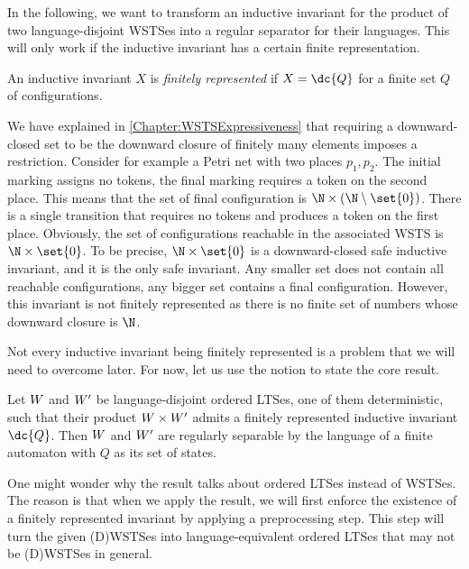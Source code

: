 \documentclass[../../diss.tex]{subfiles}
\begin{document}
In the following, we want to transform an inductive invariant for the product of two language-disjoint WSTSes into a regular separator for their languages.
This will only work if the inductive invariant has a certain finite representation.

\begin{definition}
    An inductive invariant $X$ is \emph{finitely represented} if $X = \dc{Q}$ for a finite set $Q$ of configurations.
\end{definition}

We have explained in \cref{Chapter:WSTSExpressiveness} that requiring a downward-closed set to be the downward closure of finitely many elements imposes a restriction.
Consider for example a Petri net with two places $p_1, p_2$.
The initial marking assigns no tokens, the final marking requires a token on the second place.
This means that the set of final configuration is $\N \times (\N \setminus \set{0})$.
There is a single transition that requires no tokens and produces a token on the first place.
Obviously, the set of configurations reachable in the associated WSTS is $\N \times \set{0}$.
To be precise, $\N \times \set{0}$ is a downward-closed safe inductive invariant, and it is the only safe invariant.
Any smaller set does not contain all reachable configurations, any bigger set contains a final configuration.
However, this invariant is not finitely represented as there is no finite set of numbers whose downward closure is $\N$.

Not every inductive invariant being finitely represented is a problem that we will need to overcome later.
For now, let us use the notion to state the core result.

\begin{theorem}%
\label{Theorem:WSTSSeparabilityCore}%
    Let $W$ and $W'$ be language-disjoint ordered LTSes, one of them deterministic, such that their product $W \times W'$ admits a finitely represented inductive invariant $\dc{Q}$.
    Then $W$ and $W'$ are regularly separable by the language of a finite automaton with $Q$ as its set of states.
\end{theorem}

One might wonder why the result talks about ordered LTSes instead of WSTSes.
The reason is that when we apply the result, we will first enforce the existence of a finitely represented invariant by applying a preprocessing step.
This step will turn the given (D)WSTSes into language-equivalent ordered LTSes that may not be (D)WSTSes in general.
\end{document}
